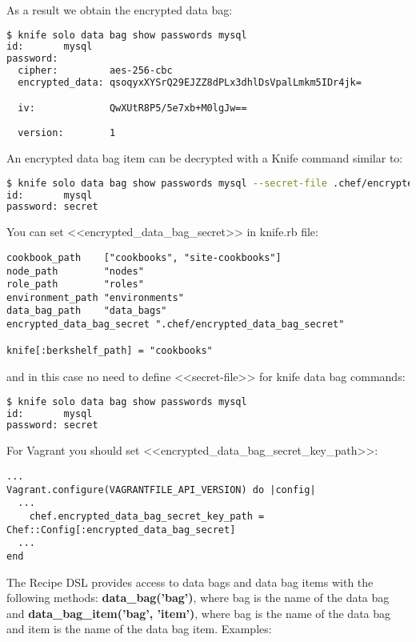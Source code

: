 As a result we obtain the encrypted data bag:

\begin{lstlisting}[language=Bash,label=lst:my-cloud-chef-databag7]
$ knife solo data bag show passwords mysql
id:       mysql
password:
  cipher:         aes-256-cbc
  encrypted_data: qsoqyxXYSrQ29EJZZ8dPLx3dhlDsVpalLmkm5IDr4jk=

  iv:             QwXUtR8P5/5e7xb+M0lgJw==

  version:        1
\end{lstlisting}

An encrypted data bag item can be decrypted with a Knife command similar to:

\begin{lstlisting}[language=Bash,label=lst:my-cloud-chef-databag8,title=my-cloud/Gemfile]
$ knife solo data bag show passwords mysql --secret-file .chef/encrypted_data_bag_secret
id:       mysql
password: secret
\end{lstlisting}

You can set <<encrypted\_data\_bag\_secret>> in knife.rb file:

\begin{lstlisting}[label=lst:my-cloud-chef-databag9,title=my-cloud/.chef/knife.rb]
cookbook_path    ["cookbooks", "site-cookbooks"]
node_path        "nodes"
role_path        "roles"
environment_path "environments"
data_bag_path    "data_bags"
encrypted_data_bag_secret ".chef/encrypted_data_bag_secret"

knife[:berkshelf_path] = "cookbooks"
\end{lstlisting}

and in this case no need to define <<secret-file>> for knife data bag commands:

\begin{lstlisting}[language=Bash,label=lst:my-cloud-chef-databag11]
$ knife solo data bag show passwords mysql
id:       mysql
password: secret
\end{lstlisting}

For Vagrant you should set <<encrypted\_data\_bag\_secret\_key\_path>>:

\begin{lstlisting}[label=lst:my-cloud-chef-databag12,title=my-cloud/Vagrantfile]
...
Vagrant.configure(VAGRANTFILE_API_VERSION) do |config|
  ...
    chef.encrypted_data_bag_secret_key_path = Chef::Config[:encrypted_data_bag_secret]
  ...
end
\end{lstlisting}

The Recipe DSL provides access to data bags and data bag items with the following methods: \textbf{data\_bag('bag')}, where bag is the name of the data bag and \textbf{data\_bag\_item('bag', 'item')}, where bag is the name of the data bag and item is the name of the data bag item. Examples:

